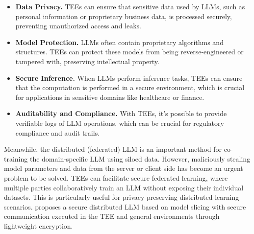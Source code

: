 \documentclass[lang=en]{sjtuarticle}
\begin{document}
\begin{itemize}
    \item \textbf{Data Privacy.} TEEs can ensure that sensitive data used by LLMs, such as personal information or proprietary business data, is processed securely, preventing unauthorized access and leaks.
    \item \textbf{Model Protection.} LLMs often contain proprietary algorithms and structures. TEEs can protect these models from being reverse-engineered or tampered with, preserving intellectual property.
    \item \textbf{Secure Inference.} When LLMs perform inference tasks, TEEs can ensure that the computation is performed in a secure environment, which is crucial for applications in sensitive domains like healthcare or finance.
    \item \textbf{Auditability and Compliance.} With TEEs, it's possible to provide verifiable logs of LLM operations, which can be crucial for regulatory compliance and audit trails.
\end{itemize}

Meanwhile, the distributed (federated) LLM is an important method for
co-training the domain-specific LLM using siloed data. However, maliciously stealing model parameters and data from
the server or client side has become an urgent problem to
be solved. TEEs can facilitate secure federated learning, where multiple parties collaboratively train an LLM without exposing their individual datasets. This is particularly useful for privacy-preserving distributed learning scenarios. \cite{huang2024fast} proposes a secure distributed
LLM based on model slicing with secure communication executed in the TEE and general environments through
lightweight encryption.
\end{document}
